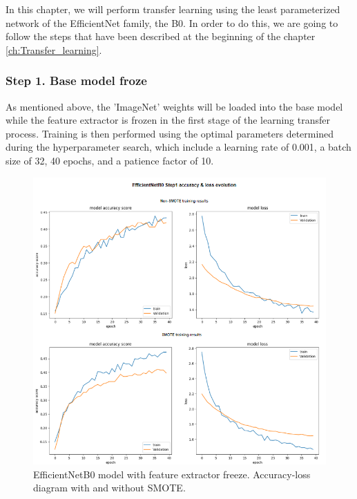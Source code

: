 In this chapter, we will perform transfer learning using the least parameterized network of the EfficientNet family, the B0. In order to do this, we are going to follow the steps that have been described at the beginning of the chapter \ref{ch:Transfer_learning}.


\subsubsection{Step 1. Base model froze}

As mentioned above, the 'ImageNet' weights will be loaded into the base model while the feature extractor is frozen in the first stage of the learning transfer process. Training is then performed using the optimal parameters determined during the hyperparameter search, which include a learning rate of 0.001, a batch size of 32, 40 epochs, and a patience factor of 10.

\begin{figure}[ht]
    \begin{center}
        \includegraphics[scale=0.60]{images/Building/Model Efficientnet/modelENetB0_1_model accuray-loss.png}
        \caption{EfficientNetB0 model with feature extractor freeze. Accuracy-loss diagram with and without SMOTE.}
    \label{fig: Model_ENet_1_accuracy_loss}    
    \end{center}
\end{figure}

